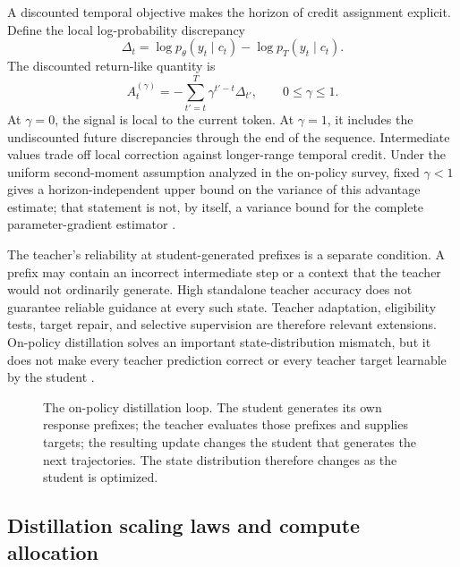 A discounted temporal objective makes the horizon of credit assignment
explicit.  Define the local log-probability discrepancy
\begin{equation}
    \Delta_t
    =\log p_\theta(y_t\mid c_t)
    -\log p_T(y_t\mid c_t).
    \label{eq:distillation-opd-local-gap}
\end{equation}
The discounted return-like quantity is
\begin{equation}
    A_t^{(\gamma)}
    =-\sum_{t'=t}^{T}
    \gamma^{t'-t}\Delta_{t'},
    \qquad 0\leq\gamma\leq 1.
    \label{eq:distillation-opd-discounted-advantage}
\end{equation}
At \(\gamma=0\), the signal is local to the current token.  At
\(\gamma=1\), it includes the undiscounted future discrepancies through
the end of the sequence.  Intermediate values trade off local correction
against longer-range temporal credit.  Under the uniform second-moment
assumption analyzed in the on-policy survey, fixed \(\gamma<1\) gives a
horizon-independent upper bound on the variance of this advantage estimate;
that statement is not, by itself, a variance bound for the complete
parameter-gradient estimator \parencite{Song2026OnPolicyDistillation}.

The teacher's reliability at student-generated prefixes is a separate
condition.  A prefix may contain an incorrect intermediate step or a context
that the teacher would not ordinarily generate.  High standalone teacher
accuracy does not guarantee reliable guidance at every such state.  Teacher
adaptation, eligibility tests, target repair, and selective supervision are
therefore relevant extensions.  On-policy distillation solves an important
state-distribution mismatch, but it does not make every teacher prediction
correct or every teacher target learnable by the student
\parencite{Song2026OnPolicyDistillation}.

\begin{figure}[htbp]
    \centering
    
    \caption{The on-policy distillation loop.  The student generates its own
    response prefixes; the teacher evaluates those prefixes and supplies
    targets; the resulting update changes the student that generates the next
    trajectories.  The state distribution therefore changes as the student
    is optimized.}
    \label{fig:distillation-on-policy-loop}
\end{figure}

\subsection{Distillation scaling laws and compute allocation}
\label{subsec:distillation-scaling-laws}

